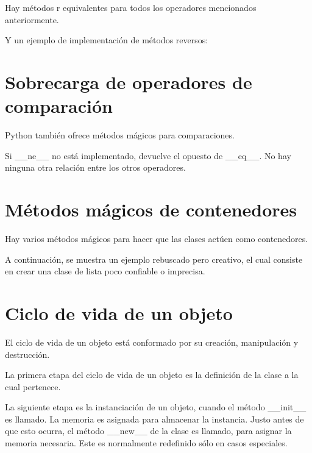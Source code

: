 \documentclass{report}
\begin{document}
Hay métodos r equivalentes para todos los operadores mencionados anteriormente.


Y un ejemplo de implementación de métodos reversos:


\section{Sobrecarga de operadores de comparación}

Python también ofrece métodos mágicos para comparaciones.


Si \_\_ne\_\_ no está implementado, devuelve el opuesto de \_\_eq\_\_. No hay ninguna otra relación entre los otros operadores.


\section{Métodos mágicos de contenedores}

Hay varios métodos mágicos para hacer que las clases actúen como contenedores.


A continuación, se muestra un ejemplo rebuscado pero creativo, el cual consiste en crear una clase de lista poco confiable o imprecisa.



\section{Ciclo de vida de un objeto}

El ciclo de vida de un objeto está conformado por su creación, manipulación y destrucción.\smallskip

La primera etapa del ciclo de vida de un objeto es la definición de la clase a la cual pertenece.\smallskip

La siguiente etapa es la instanciación de un objeto, cuando el método \_\_init\_\_ es llamado. La memoria es asignada para almacenar la instancia. Justo antes de que esto ocurra, el método \_\_new\_\_ de la clase es llamado, para asignar la memoria necesaria. Este es normalmente redefinido sólo en casos especiales.\smallskip
\end{document}
